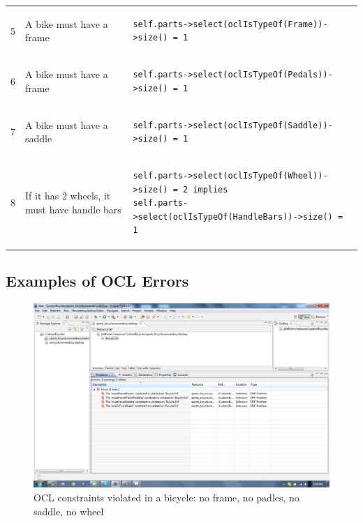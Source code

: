 \begin{table}[htp]
\begin{center}
\begin{tabular*}{\textwidth}{p{} p{} l}
5	&	A bike must have a frame &
\begin{lstlisting}
self.parts->select(oclIsTypeOf(Frame))->size() = 1
\end{lstlisting}  \\ 

6	&	A bike must have a frame &
\begin{lstlisting}
self.parts->select(oclIsTypeOf(Pedals))->size() = 1
\end{lstlisting}  \\ 

7	&	A bike must have a saddle &
\begin{lstlisting}
self.parts->select(oclIsTypeOf(Saddle))->size() = 1
\end{lstlisting}  \\ 

8	&	If it has 2 wheels, it must have handle bars &
\begin{lstlisting}
self.parts->select(oclIsTypeOf(Wheel))->size() = 2 implies
self.parts->select(oclIsTypeOf(HandleBars))->size() = 1 
\end{lstlisting}  \\ 
	\end{tabular*}
\end{center}
\end{table}

\subsection{Examples of OCL Errors}

\begin{figure}[H]
    \begin{center}
        \includegraphics[width=\textwidth]{fig/ocl_examples/ocl_bicycle_model_errors.pdf}
        \caption{OCL constraints violated in a bicycle: no frame, no padles, no
        saddle, no wheel}
        \label{fig.ocl_bike_errors}
    \end{center}
\end{figure}

